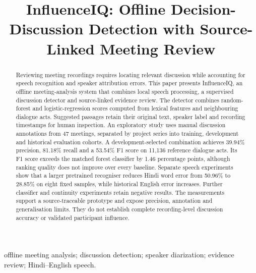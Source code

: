 \documentclass[conference,a4paper]{IEEEtran}
\begin{document}
\title{InfluenceIQ: Offline Decision-Discussion Detection with Source-Linked Meeting Review}
\author{}
\maketitle
\begin{abstract}Reviewing meeting recordings requires locating relevant discussion while accounting for speech recognition and speaker attribution errors. This paper presents InfluenceIQ, an offline meeting-analysis system that combines local speech processing, a supervised discussion detector and source-linked evidence review. The detector combines random-forest and logistic-regression scores computed from lexical features and neighbouring dialogue acts. Suggested passages retain their original text, speaker label and recording timestamps for human inspection. An exploratory study uses manual discussion annotations from 47 meetings, separated by project series into training, development and historical evaluation cohorts. A development-selected combination achieves 39.94\% precision, 81.18\% recall and a 53.54\% F1 score on 11,136 reference dialogue acts. Its F1 score exceeds the matched forest classifier by 1.46 percentage points, although ranking quality does not improve over every baseline. Separate speech experiments show that a larger pretrained recogniser reduces Hindi word error from 50.96\% to 28.85\% on eight fixed samples, while historical English error increases. Further classifier and continuity experiments retain negative results. The measurements support a source-traceable prototype and expose precision, annotation and generalisation limits. They do not establish complete recording-level discussion accuracy or validated participant influence.\end{abstract}
\begin{IEEEkeywords}offline meeting analysis; discussion detection; speaker diarization; evidence review; Hindi--English speech.\end{IEEEkeywords}
\end{document}
